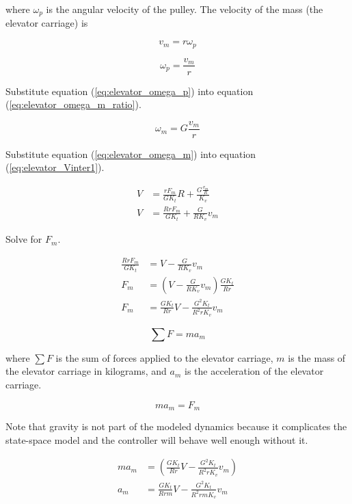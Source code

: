 where $\omega_p$ is the angular velocity of the pulley. The velocity of the mass
(the elevator carriage) is

\begin{equation*}
  v_m = r \omega_p
\end{equation*}

\begin{equation}
  \omega_p = \frac{v_m}{r} \label{eq:elevator_omega_p}
\end{equation}

Substitute equation (\ref{eq:elevator_omega_p}) into equation
(\ref{eq:elevator_omega_m_ratio}).

\begin{equation}
  \omega_m = G \frac{v_m}{r} \label{eq:elevator_omega_m}
\end{equation}

Substitute equation (\ref{eq:elevator_omega_m}) into equation
(\ref{eq:elevator_Vinter1}).

\begin{align*}
  V &= \frac{rF_m}{GK_t} R + \frac{G \frac{v_m}{R}}{K_v} \\
  V &= \frac{RrF_m}{GK_t} + \frac{G}{RK_v} v_m
\end{align*}

Solve for $F_m$.

\begin{align}
  \frac{RrF_m}{GK_t} &= V - \frac{G}{RK_v} v_m \nonumber \\
  F_m &= \left(V - \frac{G}{RK_v} v_m\right) \frac{GK_t}{Rr} \nonumber \\
  F_m &= \frac{GK_t}{Rr} V - \frac{G^2K_t}{R^2 rK_v} v_m \label{eq:elevator_F_m}
\end{align}

\begin{equation}
  \sum F = ma_m \label{eq:elevator_F_ma}
\end{equation}

where $\sum F$ is the sum of forces applied to the elevator carriage, $m$ is
the mass of the elevator carriage in kilograms, and $a_m$ is the acceleration of
the elevator carriage.

\begin{equation*}
  ma_m = F_m
\end{equation*}

Note that gravity is not part of the modeled dynamics because it complicates the
state-space \gls{model} and the controller will behave well enough without it.

\begin{align}
  ma_m &= \left(\frac{GK_t}{Rr} V - \frac{G^2K_t}{R^2 rK_v} v_m\right)
    \nonumber \\
  a_m &= \frac{GK_t}{Rrm} V - \frac{G^2K_t}{R^2 rmK_v} v_m
    \label{eq:elevator_accel}
\end{align}

